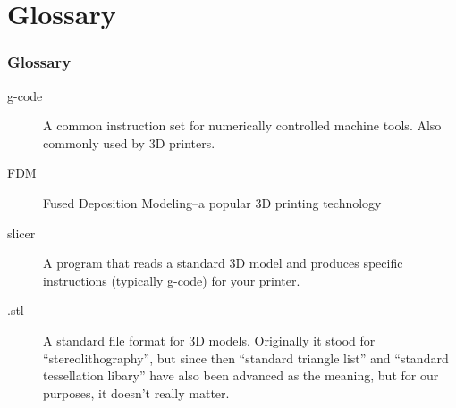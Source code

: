 \documentclass[english,10pt]{beamer}
\begin{document}
\section{Glossary}
\begin{frame}
  \frametitle{Glossary}
  \begin{description}
    \item [g-code] A common instruction set for numerically controlled machine tools.  Also commonly used by 3D printers.
    \item [FDM] Fused Deposition Modeling--a popular 3D printing technology
    \item [slicer] A program that reads a standard 3D model and produces specific instructions (typically g-code) for your printer.
    \item [.stl] A standard file format for 3D models.  Originally it stood for ``stereolithography'',  but since then ``standard triangle list'' and ``standard tessellation libary'' have also been advanced as the meaning, but for our purposes, it doesn't really matter.
  \end{description}
\end{frame}
\end{document}
